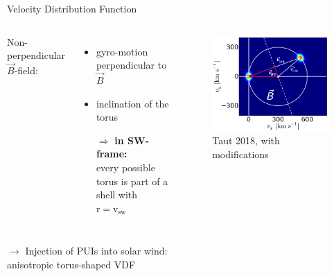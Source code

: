 \documentclass{beamer}
\begin{document}
\begin{frame}{Velocity Distribution Function}
	\begin{minipage}{1\textwidth}
	\begin{columns}
	\column{5cm}
		Non-perpendicular $\vec{B}$-field:
		\begin{itemize}
			\item gyro-motion perpendicular to $\vec{B}$
			\item inclination of the torus
			\item[\large{$\Rightarrow$}] \textbf{in SW-frame:} \\ every possible torus is part of a shell with $\mathrm{r} =\mathrm{v_{sw}}$
		\end{itemize}
	\column{5.5cm}
		\begin{figure}
			\includegraphics[scale=0.35]{pictures/2d_b_schief_v.png}
			\caption{\tiny{Taut 2018, with modifications}}
		\end{figure}
	\end{columns}
	\end{minipage}
	\vspace{4cm}
	\begin{minipage}{1\textwidth}
		\vspace{.1cm}
		\begin{center}
		$\longrightarrow$ Injection of PUIs into solar wind: \\ anisotropic torus-shaped VDF
		\end{center}
	\end{minipage}
\end{frame}
\end{document}
